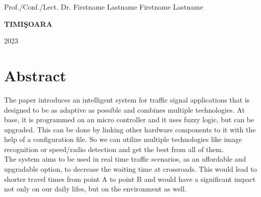 \documentclass[17pt]{article}
\begin{document}
{\large{}

\noindent Prof./Conf./Lect. Dr. Firstname  Lastname\hfill
\noindent Firstname  Lastname}


\vfill
\begin{center}
{\bf TIMI\c SOARA

2023}
\end{center}

\newpage
\normalsize{}

\section*{Abstract}
\indent \indent
The paper introduces an intelligent system for traffic
signal applications that is designed to be as adaptive
as possible and combines multiple technologies.
At base, it is programmed on an micro controller and it
uses fuzzy logic, but can be upgraded. This can be done by
linking other hardware components to it with the help of a
configuration file. So we can utilize multiple technologies
like image recognition or speed/radio detection and get the
best from all of them.\\
\indent The system aims to be used in real time
traffic scenarios, as an affordable and upgradable option,
to decrease the waiting time at crossroads.
This would lead to shorter travel times from point
A to point B and would have a significant impact not only
on our daily lifes, but on the environment as well.

\pagebreak

\tableofcontents

\pagebreak

\listoftables

\pagebreak

\listoffigures
\pagebreak
\end{document}
